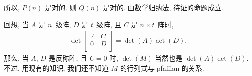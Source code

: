 \documentclass[../libro.tex]{subfiles}
\begin{document}
\begin{example}
    所以, \(P(n)\) 是对的.
    则 \(Q(n)\) 是对的.
    由数学归纳法, 待证的命题成立.

    回想, 当 \(A\) 是 \(n\)~级阵,
    \(D\) 是 \(t\)~级阵,
    且 \(C\) 是 \(n \times t\)~阵时,
    \begin{align*}
        \det {
            \begin{bmatrix}
                A & C \\
                0 & D \\
            \end{bmatrix}
        }
        = \det {(A)} \det {(D)}.
    \end{align*}
    那么, 当 \(A\), \(D\) 是反称阵,
    且 \(C = 0\) 时,
    \(\det {(M)}\)
    当然也是 \(\det {(A)} \det {(D)}\).
    不过, 用现有的知识,
    我们还不知道 \(M\) 的行列式与 pfaffian 的关系.
\end{example}
\end{document}
